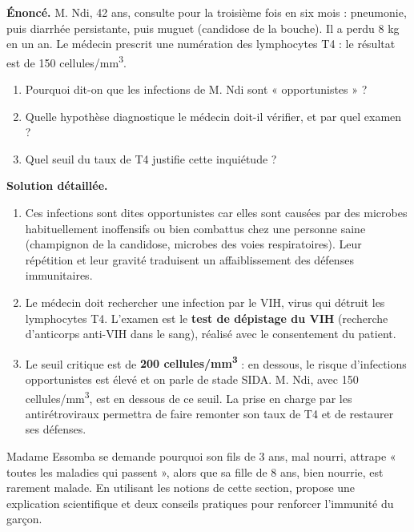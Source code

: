 \documentclass[11pt]{article}
\begin{document}
\begin{exoresolu}
\textbf{Énoncé.} M. Ndi, 42 ans, consulte pour la troisième fois en six mois : pneumonie, puis diarrhée persistante, puis muguet (candidose de la bouche). Il a perdu 8 kg en un an. Le médecin prescrit une numération des lymphocytes T4 : le résultat est de 150 cellules/mm\textsuperscript{3}.
\begin{enumerate}
\item Pourquoi dit-on que les infections de M. Ndi sont « opportunistes » ?
\item Quelle hypothèse diagnostique le médecin doit-il vérifier, et par quel examen ?
\item Quel seuil du taux de T4 justifie cette inquiétude ?
\end{enumerate}
\tcblower
\textbf{Solution détaillée.}
\begin{enumerate}
\item Ces infections sont dites opportunistes car elles sont causées par des microbes habituellement inoffensifs ou bien combattus chez une personne saine (champignon de la candidose, microbes des voies respiratoires). Leur répétition et leur gravité traduisent un affaiblissement des défenses immunitaires.
\item Le médecin doit rechercher une infection par le VIH, virus qui détruit les lymphocytes T4. L'examen est le \textbf{test de dépistage du VIH} (recherche d'anticorps anti-VIH dans le sang), réalisé avec le consentement du patient.
\item Le seuil critique est de \textbf{200 cellules/mm\textsuperscript{3}} : en dessous, le risque d'infections opportunistes est élevé et on parle de stade SIDA. M. Ndi, avec 150 cellules/mm\textsuperscript{3}, est en dessous de ce seuil. La prise en charge par les antirétroviraux permettra de faire remonter son taux de T4 et de restaurer ses défenses.
\end{enumerate}
\end{exoresolu}

\begin{exercice}
Madame Essomba se demande pourquoi son fils de 3 ans, mal nourri, attrape « toutes les maladies qui passent », alors que sa fille de 8 ans, bien nourrie, est rarement malade. En utilisant les notions de cette section, propose une explication scientifique et deux conseils pratiques pour renforcer l'immunité du garçon.
\end{exercice}
\end{document}
